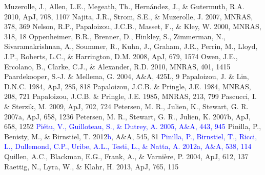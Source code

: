 \documentclass[apj]{emulateapj}
\def\blue#1{\textcolor{blue}{#1}}
\begin{document}
\begin{thebibliography}{}
 Muzerolle, J., Allen, L.E., Megeath, Th., Hern\'andez, J., \& Gutermuth, R.A. 2010, ApJ, 708, 1107
 Najita, J.R., Strom, S.E., \& Muzerolle, J. 2007, MNRAS, 378, 369
 Nelson, R.P., Papaloizou, J.C.B., Masset, F., \& Kley, W. 2000, MNRAS, 318, 18
 Oppenheimer, B.R., Brenner, D., Hinkley, S., Zimmerman, N., Sivaramakrishnan, A., Soummer, R., Kuhn, J., Graham, J.R., Perrin, M., Lloyd, J.P., Roberts, L.C., \& Harrington, D.M. 2008, ApJ, 679, 1574
 Owen, J.E., Ercolano, B., Clarke, C.J., \& Alexander, R.D. 2010, MNRAS, 401, 1415
 Paardekooper, S.-J. \& Mellema, G.	2004, A\&A, 425L, 9
 Papaloizou, J. \& Lin, D.N.C. 1984, ApJ, 285, 818
 Papaloizou, J.C.B. \& Pringle, J.E. 1984, MNRAS, 208, 721
 Papaloizou, J.C.B. \& Pringle, J.E. 1985, MNRAS, 213, 799
 Pascucci, I. \& Sterzik, M. 2009, ApJ, 702, 724
 Petersen, M. R., Julien, K., Stewart, G. R. 2007a, ApJ, 658, 1236
 Petersen, M. R., Stewart, G. R., Julien, K. 2007b, ApJ, 658, 1252
\bibitem[{{\blue{Pi\'etu et al.}}(2005)}]{Pietu05} \blue{Pi\'etu, V., Guilloteau, S., \& Dutrey, A. 2005, A\&A, 443, 945}
 Pinilla, P., Benisty, M., \& Birnstiel, T. 2012\blue{b}, A\&A, 545, 81
\bibitem[{{\blue{Pinilla et al.}}(2012a)}]{Pinilla12a} \blue{Pinilla, P., Birnstiel, T., Ricci, L., Dullemond, C.P., Uribe, A.L., Testi, L., \& Natta, A. 2012a, A\&A, 538, 114} 
 Quillen, A.C., Blackman, E.G., Frank, A., \& Varni\`ere, P. 2004, ApJ, 612, 137
 Raettig, N., Lyra, W., \& Klahr, H. 2013, ApJ, 765, 115

\end{thebibliography}
\end{document}
